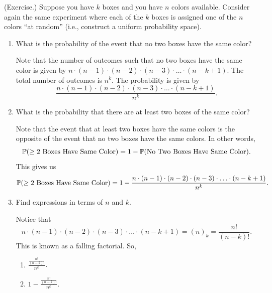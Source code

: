 \documentclass[letterpaper]{article}
\newcommand{\0}{\mathbf{0}}
\begin{document}
\begin{mdframed}
    (Exercise.) Suppose you have $k$ boxes and you have $n$ colors available. Consider again the same experiment where each of the $k$ boxes is assigned one of the $n$ colors ``at random'' (i.e., construct a uniform probability space).
    \begin{enumerate}
        \item What is the probability of the event that no two boxes have the same color? 
        \begin{mdframed}
            Note that the number of outcomes such that no two boxes have the same color is given by $n \cdot (n - 1) \cdot (n - 2) \cdot (n - 3) \cdot \hdots \cdot (n - k + 1)$. The total number of outcomes is $n^k$. The probability is given by \[\frac{n \cdot (n - 1) \cdot (n - 2) \cdot (n - 3) \cdot \hdots \cdot (n - k + 1)}{n^k}.\]
        \end{mdframed}
        \item What is the probability that there are at least two boxes of the same color? 
        \begin{mdframed}
            Note that the event that at least two boxes have the same colors is the opposite of the event that no two boxes have the same colors. In other words, 
            \[\mathbb{P}(\geq 2\text{ Boxes Have Same Color}) = 1 - \mathbb{P}(\text{No Two Boxes Have Same Color}).\]
            This gives us 
            \[\mathbb{P}(\geq 2\text{ Boxes Have Same Color}) = 1 - \frac{n \cdot (n - 1) \cdot (n - 2) \cdot (n - 3) \cdot \hdots \cdot (n - k + 1)}{n^k}.\]
        \end{mdframed}
        \item Find expressions in terms of $n$ and $k$. 
        \begin{mdframed}
            Notice that 
            \[n \cdot (n - 1) \cdot (n - 2) \cdot (n - 3) \cdot \hdots \cdot (n - k + 1) = (n)_k = \frac{n!}{(n - k)!}.\] This is known as a falling factorial. So, 
            \begin{enumerate}
                \item $\frac{\frac{n!}{(n - k)!}}{n^k}$.
                \item $1 - \frac{\frac{n!}{(n - k)!}}{n^k}$.
            \end{enumerate}
        \end{mdframed}
    \end{enumerate}
\end{mdframed}
\end{document}
